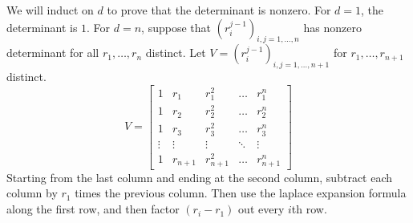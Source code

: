 \documentclass{report}
\begin{document}
We will induct on $d$ to prove that the determinant is nonzero.
For $d = 1$, the determinant is $1$.
For $d=n$, suppose that $(r_i^{j-1})_{i,j=1,\hdots,n}$ has nonzero determinant 
for all $r_1,\hdots,r_n$ distinct.
Let $V = (r_i^{j-1})_{i,j=1,\hdots,n+1}$ for $r_1,\hdots,r_{n+1}$ distinct.
\[
    V = \begin{bmatrix}
        1 & r_1 & r_1^2 & \hdots & r_1^n \\
        1 & r_2 & r_2^2 & \hdots & r_2^n \\
        1 & r_3 & r_3^2 & \hdots & r_3^n \\
        \vdots & \vdots & \vdots & \ddots & \vdots \\
        1 & r_{n+1} & r_{n+1}^2 & \hdots & r_{n+1}^n
    \end{bmatrix}
\]
Starting from the last column and ending at the second column, 
subtract each column by $r_1$ times the previous column.
Then use the laplace expansion formula along the first row, and
then factor $(r_i - r_1)$ out every $i$th row.
\end{document}
